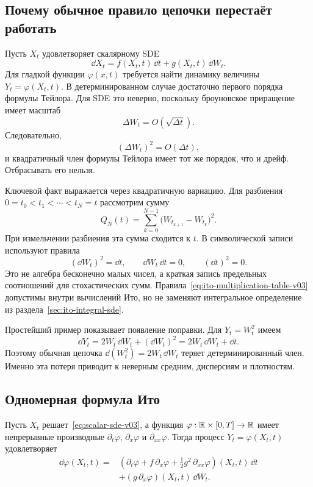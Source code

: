\subsection{Почему обычное правило цепочки перестаёт работать}

Пусть $X_t$ удовлетворяет скалярному SDE
\begin{equation}
\label{eq:scalar-sde-v03}
\dd X_t
=
f(X_t,t)\,\dd t
+
g(X_t,t)\,\dd W_t.
\end{equation}
Для гладкой функции $\varphi(x,t)$ требуется найти динамику величины $Y_t=\varphi(X_t,t)$. В детерминированном случае достаточно первого порядка формулы Тейлора. Для SDE это неверно, поскольку броуновское приращение имеет масштаб
\[
\Delta W_t=O(\sqrt{\Delta t}).
\]
Следовательно,
\[
(\Delta W_t)^2=O(\Delta t),
\]
и квадратичный член формулы Тейлора имеет тот же порядок, что и дрейф. Отбрасывать его нельзя.

Ключевой факт выражается через квадратичную вариацию. Для разбиения $0=t_0<t_1<\cdots<t_N=t$ рассмотрим сумму
\begin{equation}
\label{eq:quadratic-variation-sum-v03}
Q_N(t)
=
\sum_{k=0}^{N-1}
\bigl(W_{t_{k+1}}-W_{t_k}\bigr)^2.
\end{equation}
При измельчении разбиения эта сумма сходится к $t$. В символической записи используют правила
\begin{equation}
\label{eq:ito-multiplication-table-v03}
(\dd W_t)^2=\dd t,
\qquad
\dd W_t\,\dd t=0,
\qquad
(\dd t)^2=0.
\end{equation}
Это не алгебра бесконечно малых чисел, а краткая запись предельных соотношений для стохастических сумм. Правила~\eqref{eq:ito-multiplication-table-v03} допустимы внутри вычислений Ито, но не заменяют интегральное определение из раздела~\ref{sec:ito-integral-sde}.

Простейший пример показывает появление поправки. Для $Y_t=W_t^2$ имеем
\[
\dd Y_t
=
2W_t\,\dd W_t
+
(\dd W_t)^2
=
2W_t\,\dd W_t+\dd t.
\]
Поэтому обычная цепочка $\dd(W_t^2)=2W_t\,\dd W_t$ теряет детерминированный член. Именно эта потеря приводит к неверным средним, дисперсиям и плотностям.

\subsection{Одномерная формула Ито}

\begin{theorem}
Пусть $X_t$ решает~\eqref{eq:scalar-sde-v03}, а функция $\varphi:\mathbb{R}\times[0,T]\to\mathbb{R}$ имеет непрерывные производные $\partial_t\varphi$, $\partial_x\varphi$ и $\partial_{xx}\varphi$. Тогда процесс $Y_t=\varphi(X_t,t)$ удовлетворяет
\begin{equation}
\label{eq:ito-formula-scalar-v03}
\begin{aligned}
\dd \varphi(X_t,t)
={}&
\left(
\partial_t\varphi
+
f\,\partial_x\varphi
+
\frac12 g^2\,\partial_{xx}\varphi
\right)(X_t,t)\,\dd t
\\
&+
\left(g\,\partial_x\varphi\right)(X_t,t)\,\dd W_t.
\end{aligned}
\end{equation}
\end{theorem}

